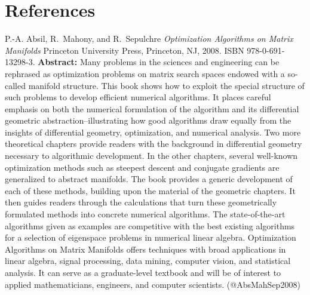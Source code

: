 \documentclass{article} %
\begin{document}
\fi


\section*{References}

\begin{thebibliography}{}
 P.-A. Absil, R.~Mahony, and R.~Sepulchre \newblock \emph{Optimization Algorithms on Matrix Manifolds} \newblock Princeton University Press, Princeton, NJ, 2008. \newblock ISBN 978-0-691-13298-3. \newblock \textbf{Abstract:} Many problems in the sciences and engineering can be rephrased as optimization problems on matrix search spaces endowed with a so-called manifold structure. This book shows how to exploit the special structure of such problems to develop efficient numerical algorithms. It places careful emphasis on both the numerical formulation of the algorithm and its differential geometric abstraction--illustrating how good algorithms draw equally from the insights of differential geometry, optimization, and numerical analysis. Two more theoretical chapters provide readers with the background in differential geometry necessary to algorithmic development. In the other chapters, several well-known optimization methods such as steepest descent and conjugate gradients are generalized to abstract manifolds. The book provides a generic development of each of these methods, building upon the material of the geometric chapters. It then guides readers through the calculations that turn these geometrically formulated methods into concrete numerical algorithms. The state-of-the-art algorithms given as examples are competitive with the best existing algorithms for a selection of eigenspace problems in numerical linear algebra. Optimization Algorithms on Matrix Manifolds offers techniques with broad applications in linear algebra, signal processing, data mining, computer vision, and statistical analysis. It can serve as a graduate-level textbook and will be of interest to applied mathematicians, engineers, and computer scientists. \newblock (@AbsMahSep2008)


\end{thebibliography}
\end{document}
